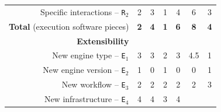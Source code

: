 \documentclass[preprint,3p,twocolumn]{elsarticle}
\newcommand{\correction}[1]{\color{blue}#1\color{black}\xspace}
\begin{document}
\begin{table}
\begin{tabular}{rcccccc}
  Specific interactions -- \texttt{R$_2$} & \cellcolor[HTML]{99EB99}2
                                     & \cellcolor[HTML]{99D699}3
                                     & \cellcolor[HTML]{99FF99}1
                                     & \cellcolor[HTML]{99C299}4
                                     & \cellcolor[HTML]{999999}6
                                     & \cellcolor[HTML]{99D699}3\\
  \textbf{Total} (execution software pieces)& \cellcolor[HTML]{99F099}\textbf{2}
                                     & \cellcolor[HTML]{99D399}\textbf{4}
                                     & \cellcolor[HTML]{99FF99}\textbf{1}
                                     & \cellcolor[HTML]{99B699}\textbf{6}
                                     & \cellcolor[HTML]{999999}\textbf{8}
                                     & \cellcolor[HTML]{99D399}\textbf{4}\\
\cellcolor[HTML]{EEEEEE}\textbf{Extensibility}& \multicolumn{6}{l}{\cellcolor[HTML]{EEEEEE}}\\
  New engine type -- \texttt{E$_1$}  & \cellcolor[HTML]{99C599}3
                                     & \cellcolor[HTML]{99C599}\correction{3}
                                     & \cellcolor[HTML]{99E299}2
                                     & \cellcolor[HTML]{99C599}3
                                     & \cellcolor[HTML]{999999}4.5
                                     & \cellcolor[HTML]{99FF99}1\\
New engine version -- \texttt{E$_2$} & \cellcolor[HTML]{999999}1
                                     & \cellcolor[HTML]{99FF99}0
                                     & \cellcolor[HTML]{999999}1
                                     & \cellcolor[HTML]{99FF99}0
                                     & \cellcolor[HTML]{99FF99}0
                                     & \cellcolor[HTML]{999999}1\\
  New workflow -- \texttt{E$_3$} & \cellcolor[HTML]{99FF99}2
                                     & \cellcolor[HTML]{99FF99}2
                                     & \cellcolor[HTML]{99FF99}2
                                     & \cellcolor[HTML]{99FF99}2
                                     & \cellcolor[HTML]{99FF99}2
                                     & \cellcolor[HTML]{999999}3\\
New infrastructure -- \texttt{E$_4$} & \cellcolor[HTML]{99DD99}4
                                     & \cellcolor[HTML]{99DD99}4
                                     & \cellcolor[HTML]{99FF99}3
                                     & \cellcolor[HTML]{99DD99}4

\end{tabular}
\end{table}
\end{document}
